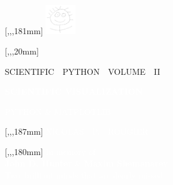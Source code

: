 \documentclass[
  coverheight=248mm, %
  coverwidth=167mm, %
  bleedwidth=3mm,     %
  spinewidth=23mm,    %
  marklength=0mm,     %
  markcolor=white
]{bookcover}
\begin{document}
\begin{bookcover}
    [,,,181mm]{
      \centering
      \includegraphics[width=13mm]{./gravatar.png}
    }
    
    [,,,20mm]{
      \centering
      \textcolor{yellow!80!white}{\small SCIENTIFIC~~PYTHON~~VOLUME~~II}

      \textcolor{white}{\Large \bfseries SCIENTIFIC VISUALIZATION}

      \vspace{-1pt}
      \textcolor{white}{\large PYTHON \& MATPLOTLIB}
    }

    [,,,187mm]{
      \centering
      \textcolor{white}{NICOLAS~~P.~~ROUGIER}
    }

    [,,,180mm]{
      \centering
      \textcolor{white}{In memory of\\
      \textbf{John D. Hunter}
      \&
      \textbf{Maxim Shemanarev}\\
      Two brilliant minds that are dearly missed.}
    }


  \end{bookcover}
\end{document}
